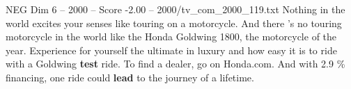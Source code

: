\begin{textsample}{NEG Dim 6 – 2000 – Score -2.00 – 2000/tv\_com\_2000\_119.txt}  \label{ex:f6_neg_004}
Nothing in the world excites your senses like touring on a motorcycle.
And there 's no touring motorcycle in the world like the Honda Goldwing 1800, the motorcycle of the year.
Experience for yourself the ultimate in luxury and how easy it is to ride with a Goldwing \textbf{test} ride.
To find a dealer, go on Honda.com.
And with 2.9 \% financing, one ride could \textbf{lead} to the journey of a lifetime.

\end{textsample}
